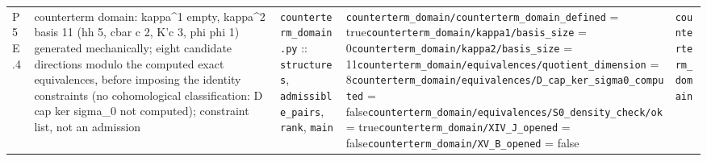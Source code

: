 {\begin{longtable}{@{}p{0.9cm}p{4.1cm}p{3.5cm}p{5.0cm}p{3.0cm}@{}}
P5E.4 & counterterm domain: kappa\^{}1 empty, kappa\^{}2 basis 11 (hh 5, cbar c 2, K'c 3, phi phi 1) generated mechanically; eight candidate directions modulo the computed exact equivalences, before imposing the identity constraints (no cohomological classification: D cap ker sigma\_0 not computed); constraint list, not an admission & \texttt{counterterm\_\allowbreak{}domain.\allowbreak{}py} :: \texttt{structures}, \texttt{admissible\_\allowbreak{}pairs}, \texttt{rank}, \texttt{main} & \texttt{\allowbreak{}counterterm\_\allowbreak{}domain/\allowbreak{}counterterm\_\allowbreak{}domain\_\allowbreak{}defined} = true\newline \texttt{\allowbreak{}counterterm\_\allowbreak{}domain/\allowbreak{}kappa1/\allowbreak{}basis\_\allowbreak{}size} = 0\newline \texttt{\allowbreak{}counterterm\_\allowbreak{}domain/\allowbreak{}kappa2/\allowbreak{}basis\_\allowbreak{}size} = 11\newline \texttt{\allowbreak{}counterterm\_\allowbreak{}domain/\allowbreak{}equivalences/\allowbreak{}quotient\_\allowbreak{}dimension} = 8\newline \texttt{\allowbreak{}counterterm\_\allowbreak{}domain/\allowbreak{}equivalences/\allowbreak{}D\_\allowbreak{}cap\_\allowbreak{}ker\_\allowbreak{}sigma0\_\allowbreak{}computed} = false\newline \texttt{\allowbreak{}counterterm\_\allowbreak{}domain/\allowbreak{}equivalences/\allowbreak{}S0\_\allowbreak{}density\_\allowbreak{}check/\allowbreak{}ok} = true\newline \texttt{\allowbreak{}counterterm\_\allowbreak{}domain/\allowbreak{}XIV\_\allowbreak{}J\_\allowbreak{}opened} = false\newline \texttt{\allowbreak{}counterterm\_\allowbreak{}domain/\allowbreak{}XV\_\allowbreak{}B\_\allowbreak{}opened} = false & \texttt{counterterm\_\allowbreak{}domain} \\

\end{longtable}}
